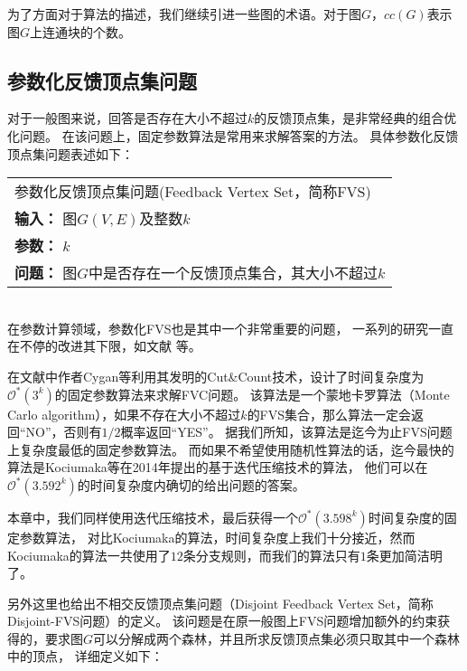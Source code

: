 为了方面对于算法的描述，我们继续引进一些图的术语。对于图$G$，$cc(G)$表示图$G$上连通块的个数。

\subsection{参数化反馈顶点集问题}
对于一般图来说，回答是否存在大小不超过$k$的反馈顶点集，是非常经典的组合优化问题。
在该问题上，固定参数算法是常用来求解答案的方法。
具体参数化反馈顶点集问题表述如下：\\

\begin{tabular}{| p{0.9\headwidth} |}
  \hline
  参数化反馈顶点集问题(Feedback Vertex Set，简称FVS) \\
  \textbf{输入：} 图$G(V, E)$及整数$k$ \\
  \textbf{参数：} $k$\\
  \textbf{问题：} 图$G$中是否存在一个反馈顶点集合，其大小不超过$k$\\
  \hline
\end{tabular} \vspace{0.5cm} \\

在参数计算领域，参数化FVS也是其中一个非常重要的问题，
一系列的研究一直在不停的改进其下限，如文献\cite{bodlaender1994disjoint,downey1992fixed,downey2012parameterized,raman2006faster,kanj2004parameterized,dehne20072o,guo2006compression,chen2008improved,cao2010feedback,cygan2011solving,kociumaka2014faster} 等。

在文献\cite{cygan2011solving}中作者Cygan等利用其发明的Cut\&Count技术，设计了时间复杂度为$\mathcal{O}^*(3^k)$的固定参数算法来求解FVC问题。
该算法是一个蒙地卡罗算法（Monte Carlo algorithm），如果不存在大小不超过$k$的FVS集合，那么算法一定会返回“NO”，否则有$1/2$概率返回“YES”。
据我们所知，该算法是迄今为止FVS问题上复杂度最低的固定参数算法。
而如果不希望使用随机性算法的话，迄今最快的算法是Kociumaka等在2014年提出的基于迭代压缩技术的算法，
他们可以在$\mathcal{O}^*(3.592^k)$的时间复杂度内确切的给出问题的答案。

本章中，我们同样使用迭代压缩技术，最后获得一个$\mathcal{O}^*(3.598^k)$时间复杂度的固定参数算法，
对比Kociumaka的算法，时间复杂度上我们十分接近，然而Kociumaka的算法一共使用了$12$条分支规则，而我们的算法只有$1$条更加简洁明了。

另外这里也给出不相交反馈顶点集问题（Disjoint Feedback Vertex Set，简称Disjoint-FVS问题）的定义。
该问题是在原一般图上FVS问题增加额外的约束获得的，要求图$G$可以分解成两个森林，并且所求反馈顶点集必须只取其中一个森林中的顶点，
详细定义如下：\\

